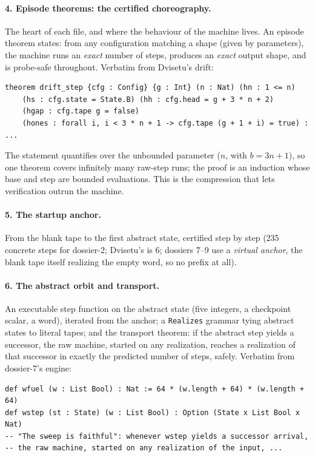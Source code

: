 \documentclass[11pt]{article}
\begin{document}
\paragraph{4. Episode theorems: the certified choreography.} The
heart of each file, and where the behaviour of the machine lives.
An episode theorem states: from any configuration matching a shape
(given by parameters), the machine runs an \emph{exact} number of
steps, produces an \emph{exact} output shape, and is probe-safe
throughout. Verbatim from Dvisetu's drift:
\begin{small}
\begin{verbatim}
theorem drift_step {cfg : Config} {g : Int} (n : Nat) (hn : 1 <= n)
    (hs : cfg.state = State.B) (hh : cfg.head = g + 3 * n + 2)
    (hgap : cfg.tape g = false)
    (hones : forall i, i < 3 * n + 1 -> cfg.tape (g + 1 + i) = true) : ...
\end{verbatim}
\end{small}
The statement quantifies over the unbounded parameter ($n$, with
$b = 3n+1$), so one theorem covers infinitely many raw-step runs;
the proof is an induction whose base and step are bounded
evaluations. This is the compression that lets verification outrun
the machine.

\paragraph{5. The startup anchor.} From the blank tape to the first
abstract state, certified step by step (235 concrete steps for
dossier-2; Dvisetu's is 6; dossiers 7--9 use a \emph{virtual anchor},
the blank tape itself realizing the empty word, so no prefix at all).

\paragraph{6. The abstract orbit and transport.} An executable step
function on the abstract state (five integers, a checkpoint scalar,
a word), iterated from the anchor; a \texttt{Realizes} grammar tying
abstract states to literal tapes; and the transport theorem: if the
abstract step yields a successor, the raw machine, started on any
realization, reaches a realization of that successor in exactly the
predicted number of steps, safely. Verbatim from dossier-7's engine:
\begin{small}
\begin{verbatim}
def wfuel (w : List Bool) : Nat := 64 * (w.length + 64) * (w.length + 64)
def wstep (st : State) (w : List Bool) : Option (State x List Bool x Nat)
-- "The sweep is faithful": whenever wstep yields a successor arrival,
-- the raw machine, started on any realization of the input, ...
\end{verbatim}
\end{small}
\end{document}

